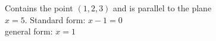 {Contains the point $(1,2,3)$ and is parallel to the plane\\
$x=5$.
}
{Standard form: $x-1=0$\\
general form: $x=1$
}

